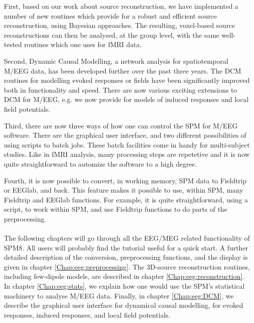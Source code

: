 First, based on our work about source reconstruction, we have
implemented a number of new routines which provide for a robust and
efficient source reconstruction, using Bayesian approaches. The
resulting, voxel-based source reconstructions can then be analysed, at
the group level, with the same well-tested routines which one uses for
fMRI data.

Second, Dynamic Causal Modelling, a network analysis for spatiotemporal
M/EEG data, has been developed further over the past three years. The
DCM routines for modelling evoked responses or 
fields have been significantly improved both in functionality and
speed. There are now various exciting extensions to DCM for M/EEG,
e.g. we now provide for models of induced responses and local field
potentials. 

Third, there are now three ways of how one can control the
SPM for M/EEG software. There are the graphical user interface, and two
different possibilities of using scripts to batch jobs. These batch
facilities come in handy for multi-subject studies. Like in fMRI
analysis, many processing steps are repetetive and it is now quite
straightforward to automize the software to a high degree.

Fourth, it is now possible to convert, in working memory, SPM
data to Fieldtrip or EEGlab, and back. This feature makes it possible to 
use, within SPM, many Fieldtrip and EEGlab functions. For example, it
is quite straightforward, using a script, to work within SPM, and use
Fieldtrip functions to do parts of the preprocessing. 
\\
\\
The following chapters will go through all the EEG/MEG related
functionality of SPM8. All users will probably find the tutorial
useful for a quick start. A further detailed description of the
conversion, preprocessing functions, and the display is given in chapter
\ref{Chap:eeg:preprocessing}. The 3D-source reconstruction routines,
including few-dipole models, are described in chapter
\ref{Chap:eeg:reconstruction}. In chapter \ref{Chap:eeg:stats}, we
explain how one would use the SPM's statistical machinery to analyse
M/EEG data. Finally, in chapter \ref{Chap:eeg:DCM}, we describe the
graphical user interface for dynamical causal modelling, for evoked  
responses, induced responses, and local field potentials.


